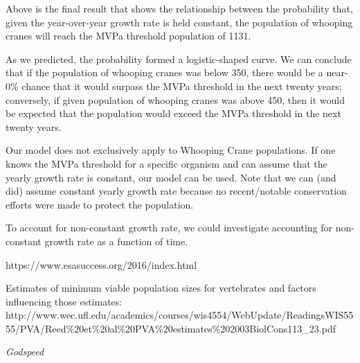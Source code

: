 \documentclass[11pt]{article}
\begin{document}
    Above is the final result that shows the relationship between the
probability that, given the year-over-year growth rate is held constant,
the population of whooping cranes will reach the MVPa threshold
population of 1131.

As we predicted, the probability formed a logistic-shaped curve. We can
conclude that if the population of whooping cranes was below 350, there
would be a near-0\% chance that it would surpass the MVPa threshold in
the next twenty years; conversely, if given population of whooping
cranes was above 450, then it would be expected that the population
would exceed the MVPa threshold in the next twenty years.

    Our model does not exclusively apply to Whooping Crane populations. If
one knows the MVPa threshold for a specific organism and can assume that
the yearly growth rate is constant, our model can be used. Note that we
can (and did) assume constant yearly growth rate because no
recent/notable conservation efforts were made to protect the population.

To account for non-constant growth rate, we could investigate accounting
for non-constant growth rate as a function of time.

    https://www.esasuccess.org/2016/index.html

Estimates of minimum viable population sizes for vertebrates and factors
influencing those estimates:
http://www.wec.ufl.edu/academics/courses/wis4554/WebUpdate/ReadingsWIS5555/PVA/Reed\%20et\%20al\%20PVA\%20estimates\%202003BiolCons113\_23.pdf

    \emph{Godspeed}


    
    
    
    
\end{document}
